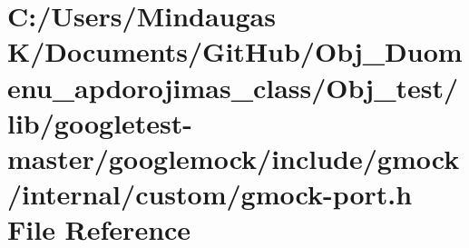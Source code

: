 \hypertarget{_obj__test_2lib_2googletest-master_2googlemock_2include_2gmock_2internal_2custom_2gmock-port_8h}{}\section{C\+:/\+Users/\+Mindaugas K/\+Documents/\+Git\+Hub/\+Obj\+\_\+\+Duomenu\+\_\+apdorojimas\+\_\+class/\+Obj\+\_\+test/lib/googletest-\/master/googlemock/include/gmock/internal/custom/gmock-\/port.h File Reference}
\label{_obj__test_2lib_2googletest-master_2googlemock_2include_2gmock_2internal_2custom_2gmock-port_8h}
